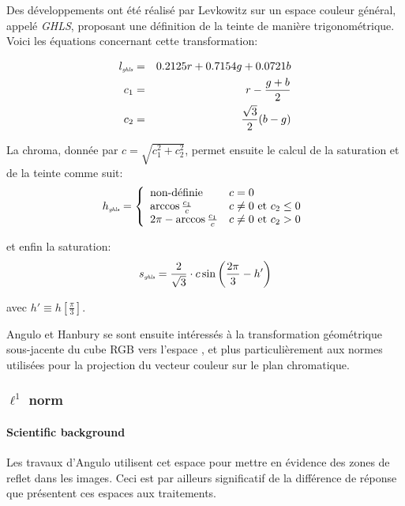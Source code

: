 Des développements ont été réalisé par Levkowitz \cite{levkowitz:ghls:93} sur un espace couleur \HLS général, appelé \textit{GHLS}, proposant une définition de la teinte de manière trigonométrique. Voici les équations concernant cette transformation:

\begin{eqnarray}
	l_{\textit{\tiny ghls}} & = & 0.2125 r + 0.7154 g + 0.0721 b \nonumber \\
	c_{1} & = & r - \frac{g + b}{2} \nonumber \\
	c_{2} & = & \frac{\sqrt{3}}{2}(b-g) \nonumber 
\end{eqnarray}

La chroma, donnée par $c = \sqrt{c_1^2 + c_2^2}$, permet ensuite le calcul de la saturation et de la teinte comme suit:
\begin{equation}
	h_{\textit{\tiny ghls}} = \left\{ 
		\begin{array}{ll}
			\text{non-définie} & c = 0\\
			\arccos{\frac{c_1}{c}} & c \neq 0 \text{ et } c_2 \leq 0 \\
			2\pi - \arccos{\frac{c_1}{c}} & c \neq 0 \text{ et } c_2 > 0
		\end{array}
	\right.
	\label{equ;transformation_GHLS_H}
\end{equation}

et enfin la saturation:
\begin{equation}
s_{\textit{\tiny ghls}} = \frac{2}{\sqrt{3}} \cdot c \sin\left({\frac{2\pi}{3} - h'}\right)
\label{equ:transformation_GHLS_S}
\end{equation}

avec $h' \equiv h [\frac{\pi}{3}]$. 


Angulo et Hanbury se sont ensuite intéressés à la transformation géométrique sous-jacente du cube RGB vers l'espace \HLS, et plus particulièrement aux normes utilisées pour la projection du vecteur couleur sur le plan chromatique.

\subsubsection{$\ell^1$ norm}


\paragraph{Scientific background}
Les travaux d'Angulo \cite{angulo_lopez_2003} utilisent cet espace pour mettre en évidence des zones de reflet dans les images. Ceci est par ailleurs significatif de la différence de réponse que présentent ces espaces aux traitements.
 
